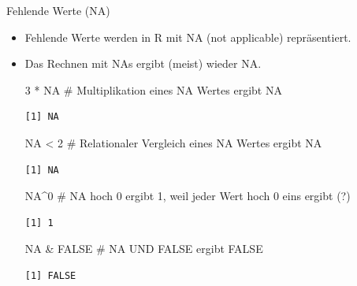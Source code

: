 \documentclass[
  8pt,
  ignorenonframetext,
]{beamer}
\newenvironment{Shaded}{\begin{snugshade}}{\end{snugshade}}
\newcommand{\CommentTok}[1]{\textcolor[rgb]{0.37,0.37,0.37}{#1}}
\newcommand{\ConstantTok}[1]{\textcolor[rgb]{0.56,0.35,0.01}{#1}}
\newcommand{\DecValTok}[1]{\textcolor[rgb]{0.68,0.00,0.00}{#1}}
\newcommand{\SpecialCharTok}[1]{\textcolor[rgb]{0.37,0.37,0.37}{#1}}
\begin{document}
\begin{frame}[fragile]{Fehlende Werte (NA)}
\protect\hypertarget{fehlende-werte-na}{}
\small
{}

\begin{itemize}
\item
  Fehlende Werte werden in R mit NA (not applicable) repräsentiert.
\item
  Das Rechnen mit NAs ergibt (meist) wieder NA. 
  \footnotesize

\begin{Shaded}
\begin{Highlighting}[]
\DecValTok{3} \SpecialCharTok{*} \ConstantTok{NA}                  \CommentTok{\# Multiplikation eines NA Wertes ergibt NA}
\end{Highlighting}
\end{Shaded}

\begin{verbatim}
[1] NA
\end{verbatim}

  \vspace{2mm}

\begin{Shaded}
\begin{Highlighting}[]
\ConstantTok{NA} \SpecialCharTok{\textless{}} \DecValTok{2}                  \CommentTok{\# Relationaler Vergleich eines NA Wertes ergibt NA}
\end{Highlighting}
\end{Shaded}

\begin{verbatim}
[1] NA
\end{verbatim}

  \vspace{2mm}

\begin{Shaded}
\begin{Highlighting}[]
\ConstantTok{NA}\SpecialCharTok{\^{}}\DecValTok{0}                    \CommentTok{\# NA hoch 0 ergibt 1, weil jeder Wert hoch 0 eins ergibt (?)}
\end{Highlighting}
\end{Shaded}

\begin{verbatim}
[1] 1
\end{verbatim}

  \vspace{2mm}

\begin{Shaded}
\begin{Highlighting}[]
\ConstantTok{NA} \SpecialCharTok{\&} \ConstantTok{FALSE}              \CommentTok{\# NA UND FALSE  ergibt FALSE}
\end{Highlighting}
\end{Shaded}

\begin{verbatim}
[1] FALSE
\end{verbatim}

  \vspace{2mm}
\end{itemize}
\end{frame}
\end{document}
